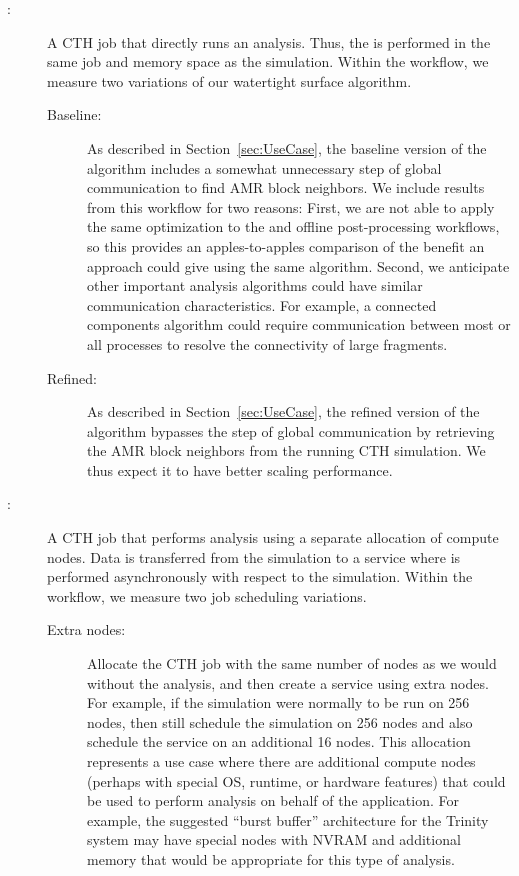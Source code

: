 \begin{description}

\item[\Insitu:] A CTH job that directly runs an \insitu analysis.  Thus,
  the \vda is performed in the same job and memory space as the
  simulation.  Within the \insitu workflow, we measure two variations of
  our watertight surface algorithm.

  \begin{description}

  \item[Baseline:] As described in Section~\ref{sec:UseCase}, the baseline
    version of the algorithm includes a somewhat unnecessary step of global
    communication to find AMR block neighbors.  We include results from
    this workflow for two reasons: First, we are not able to apply the same
    optimization to the \intransit and offline post-processing workflows,
    so this provides an apples-to-apples comparison of the benefit an
    \intransit approach could give using the same algorithm.  Second, we
    anticipate other important analysis algorithms could have similar
    communication characteristics.  For example, a connected components
    algorithm could require communication between most or all processes to
    resolve the connectivity of large fragments.

  \item[Refined:] As described in Section~\ref{sec:UseCase}, the refined
    version of the algorithm bypasses the step of global communication by
    retrieving the AMR block neighbors from the running CTH simulation.  We
    thus expect it to have better scaling performance.

  \end{description}

\item[\Intransit:] A CTH job that performs \intransit analysis using a
  separate allocation of compute nodes.  Data is transferred from the
  simulation to a service where \vda is performed asynchronously with
  respect to the simulation.  Within the \intransit workflow, we measure
  two job scheduling variations.

  \begin{description}

  \item[Extra nodes:] Allocate the CTH job with the same number of nodes as
    we would without the analysis, and then create a \vda service using
    extra nodes.  For example, if the simulation were normally to be run on
    256 nodes, then still schedule the simulation on 256 nodes and also
    schedule the \vda service on an additional 16 nodes.  This allocation
    represents a use case where there are additional compute nodes (perhaps
    with special OS, runtime, or hardware features) that could be used to
    perform analysis on behalf of the application.  For example, the
    suggested ``burst buffer'' architecture for the Trinity system may have
    special nodes with NVRAM and additional memory that would be
    appropriate for this type of \intransit analysis.


\end{description}
\end{description}
